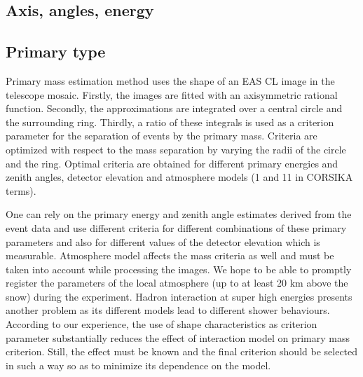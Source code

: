 \documentclass[a4paper,11pt]{article}
\begin{document}
\subsection{Axis, angles, energy}
\subsection{Primary type}
Primary mass estimation method uses the shape of an EAS CL image in the telescope mosaic. Firstly, the images are fitted with an axisymmetric rational function. Secondly, the approximations are integrated over a central circle and the surrounding ring. Thirdly, a ratio of these integrals is used as a criterion parameter for the separation of events by the primary mass. Criteria are optimized with respect to the mass separation by varying the radii of the circle and the ring. Optimal criteria are obtained for different primary energies and zenith angles, detector elevation and atmosphere models (1 and 11 in CORSIKA terms).

One can rely on the primary energy and zenith angle estimates derived from the event data and use different criteria for different combinations of these primary parameters and also for different values of the detector elevation which is measurable. Atmosphere model affects the mass criteria as well and must be taken into account while processing the images.
We hope to be able to promptly register the parameters of the local atmosphere (up to at least 20 km above the snow) during the experiment. Hadron interaction at super high energies presents another problem as its different models lead to different shower behaviours. According to our experience, the use of shape characteristics as criterion parameter substantially reduces the effect of interaction model on primary mass criterion. Still, the effect must be known and the final criterion should be selected in such a way so as to minimize its dependence on the model.
\end{document}
